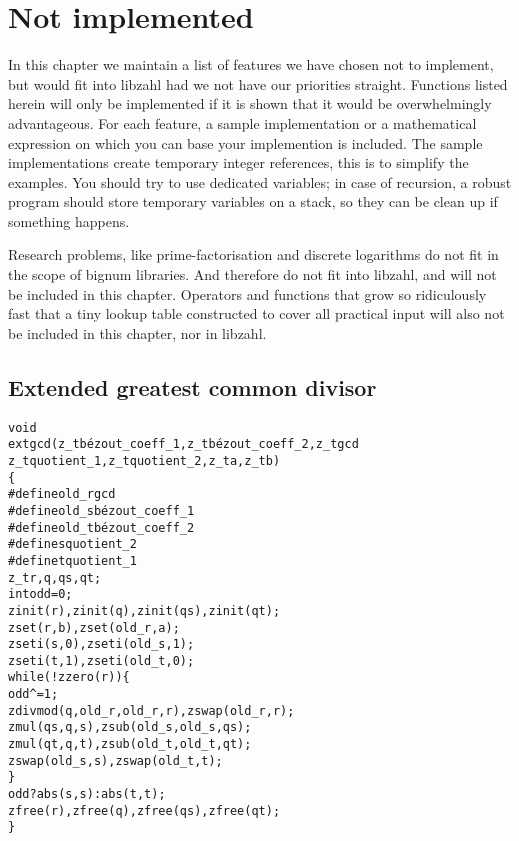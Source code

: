 \chapter{Not implemented}
\label{chap:Not implemented}

In this chapter we maintain a list of
features we have chosen not to implement,
but would fit into libzahl had we not have
our priorities straight. Functions listed
herein will only be implemented if it is
shown that it would be overwhelmingly
advantageous. For each feature, a sample
implementation or a mathematical expression
on which you can base your implemention
is included. The sample implementations create
temporary integer references, this is to
simplify the examples. You should try to
use dedicated variables; in case of recursion,
a robust program should store temporary
variables on a stack, so they can be
clean up if something happens.

Research problems, like prime-factorisation
and discrete logarithms do not fit in the
scope of bignum libraries. %
And therefore do not fit into libzahl,
and will not be included in this chapter.
Operators and functions that grow so
ridiculously fast that a tiny lookup table
constructed to cover all practical input
will also not be included in this chapter,
nor in libzahl.

\vspace{1cm}
\minitoc


\newpage
\section{Extended greatest common divisor}
\label{sec:Extended greatest common divisor}

\begin{alltt}
void
extgcd(z_t bézout_coeff_1, z_t bézout_coeff_2, z_t gcd
       z_t quotient_1, z_t quotient_2, z_t a, z_t b)
\{
#define old_r gcd
#define old_s bézout_coeff_1
#define old_t bézout_coeff_2
#define s quotient_2
#define t quotient_1
    z_t r, q, qs, qt;
    int odd = 0;
    zinit(r), zinit(q), zinit(qs), zinit(qt);
    zset(r, b), zset(old_r, a);
    zseti(s, 0), zseti(old_s, 1);
    zseti(t, 1), zseti(old_t, 0);
    while (!zzero(r)) \{
        odd ^= 1;
        zdivmod(q, old_r, old_r, r), zswap(old_r, r);
        zmul(qs, q, s), zsub(old_s, old_s, qs);
        zmul(qt, q, t), zsub(old_t, old_t, qt);
        zswap(old_s, s), zswap(old_t, t);
    \}
    odd ? abs(s, s) : abs(t, t);
    zfree(r), zfree(q), zfree(qs), zfree(qt);
\}
\end{alltt}

